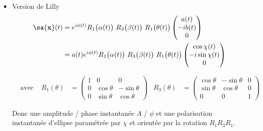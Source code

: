 \begin{itemize}
	\item Version de Lilly \cite{lilly_modulated_2011}
	\begin{equation}
		\begin{aligned}
			\sa{\bf{x}}(t) &= e^{i\phi(t)} R_1\big(\alpha(t)\big)\ R_3\big(\beta(t)\big)\ R_1\big(\theta(t)\big)\begin{pmatrix}
				a(t) \\ -ib(t) \\ 0
			\end{pmatrix} \\
			&= a(t)e^{i\phi(t)} R_1\big(\alpha(t)\big)\ R_3\big(\beta(t)\big)\ R_1\big(\theta(t)\big)\begin{pmatrix}
				\cos\chi(t) \\ -i\sin\chi(t) \\ 0
			\end{pmatrix}
		\end{aligned}
	\end{equation}
	
	\begin{align*}
		&\text{avec : }  &  
		R_1(\theta) &= \begin{pmatrix}
			1 & 0 & 0 \\ 0 & \cos\theta & -\sin\theta \\ 0 & \sin\theta & \cos\theta
		\end{pmatrix}  &  
		R_3(\theta) &= \begin{pmatrix}
			\cos\theta & -\sin\theta & 0 \\ \sin\theta & \cos\theta & 0 \\ 0 & 0 & 1 
		\end{pmatrix}
	\end{align*}
	
	Donc une amplitude / phase instantanée $A$ / $\phi$ et une polarisation instantanée d'ellipse paramétrée par $\chi$ et orientée par la rotation $R_1R_3R_1$.
	

\end{itemize}
